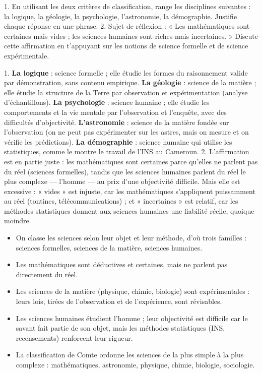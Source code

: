\documentclass[11pt]{article}
\newcommand{\cle}[1]{{\popxbold\color{popdark}#1}}
\begin{document}
\begin{exercice}
1. En utilisant les deux critères de classification, range les disciplines suivantes : la logique, la géologie, la psychologie, l'astronomie, la démographie. Justifie chaque réponse en une phrase.
2. Sujet de réflexion : « Les mathématiques sont certaines mais vides ; les sciences humaines sont riches mais incertaines. » Discute cette affirmation en t'appuyant sur les notions de science formelle et de science expérimentale.
\end{exercice}

\begin{corrige}[Exercice n°1]
1. \textbf{La logique} : science formelle ; elle étudie les formes du raisonnement valide par démonstration, sans contenu empirique. \textbf{La géologie} : science de la matière ; elle étudie la structure de la Terre par observation et expérimentation (analyse d'échantillons). \textbf{La psychologie} : science humaine ; elle étudie les comportements et la vie mentale par l'observation et l'enquête, avec des difficultés d'objectivité. \textbf{L'astronomie} : science de la matière fondée sur l'observation (on ne peut pas expérimenter sur les astres, mais on mesure et on vérifie les prédictions). \textbf{La démographie} : science humaine qui utilise les statistiques, comme le montre le travail de l'INS au Cameroun.
2. L'affirmation est en partie juste : les mathématiques sont certaines parce qu'elles ne parlent pas du réel (sciences formelles), tandis que les sciences humaines parlent du réel le plus complexe — l'homme — au prix d'une objectivité difficile. Mais elle est excessive : « vides » est injuste, car les mathématiques s'appliquent puissamment au réel (tontines, télécommunications) ; et « incertaines » est relatif, car les méthodes statistiques donnent aux sciences humaines une fiabilité réelle, quoique moindre.
\end{corrige}

\begin{aretenir}
\begin{itemize}
\item On classe les sciences selon leur \cle{objet} et leur \cle{méthode}, d'où trois familles : sciences formelles, sciences de la matière, sciences humaines.
\item Les \cle{mathématiques} sont déductives et certaines, mais ne parlent pas directement du réel.
\item Les \cle{sciences de la matière} (physique, chimie, biologie) sont expérimentales : leurs lois, tirées de l'observation et de l'expérience, sont révisables.
\item Les \cle{sciences humaines} étudient l'homme ; leur objectivité est difficile car le savant fait partie de son objet, mais les méthodes statistiques (INS, recensements) renforcent leur rigueur.
\item La classification de \cle{Comte} ordonne les sciences de la plus simple à la plus complexe : mathématiques, astronomie, physique, chimie, biologie, sociologie.
\end{itemize}
\end{aretenir}
\end{document}
